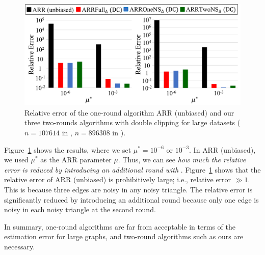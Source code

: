 \begin{figure}[t]
  \centering
  \includegraphics[width=0.99\linewidth]{fig/resB_one_round_large.pdf}
  
  \caption[Relative error of the one-round algorithm and our three two-round algorithms with double clipping on large datasets.]
	{Relative error of the one-round algorithm \textsf{ARR (unbiased)} and our three two-rounds algorithms with double clipping for large datasets ($n=107614$ in \GPlus{}, $n=896308$ in \IMDB{}).}
  \label{chap2-fig:resB_large}
\end{figure}

Figure~\ref{chap2-fig:resB_large} shows the results, where we set
$\mu^* = 10^{-6}$ or $10^{-3}$.
In \textsf{ARR (unbiased)}, we used $\mu^*$ as 
the ARR parameter $\mu$. 
Thus, we can see \textit{how much the relative error is reduced by introducing an additional round with \AlgOne{}}.
Figure~\ref{chap2-fig:resB_large} shows that the relative error of \textsf{ARR (unbiased)} is prohibitively large; i.e., relative error $\gg 1$.
This is because three edges are noisy in any noisy triangle. 
The relative error is significantly reduced by  introducing an additional round
because only one edge is noisy in each noisy triangle at the second round.

In summary, one-round algorithms are far from acceptable in terms of the estimation error for large graphs, and two-round algorithms such as ours are necessary.

